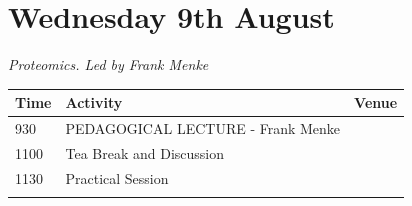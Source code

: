 \documentclass[12pt,]{book}
\theoremstyle{definition}
\theoremstyle{definition}
\theoremstyle{remark}
\begin{document}
\section*{Wednesday 9th August}\label{wednesday-9th-august}

\emph{Proteomics. Led by Frank Menke}

\begin{longtable}[]{@{}lll@{}}
\toprule
\begin{minipage}[b]{0.09\columnwidth}\raggedright\strut
Time\strut
\end{minipage} & \begin{minipage}[b]{0.38\columnwidth}\raggedright\strut
Activity\strut
\end{minipage} & \begin{minipage}[b]{0.38\columnwidth}\raggedright\strut
Venue\strut
\end{minipage}\tabularnewline
\midrule
\endhead
\begin{minipage}[t]{0.09\columnwidth}\raggedright\strut
930\strut
\end{minipage} & \begin{minipage}[t]{0.38\columnwidth}\raggedright\strut
PEDAGOGICAL LECTURE - Frank Menke\strut
\end{minipage} & \begin{minipage}[t]{0.38\columnwidth}\raggedright\strut
\strut
\end{minipage}\tabularnewline
\begin{minipage}[t]{0.09\columnwidth}\raggedright\strut
1100\strut
\end{minipage} & \begin{minipage}[t]{0.38\columnwidth}\raggedright\strut
Tea Break and Discussion\strut
\end{minipage} & \begin{minipage}[t]{0.38\columnwidth}\raggedright\strut
\strut
\end{minipage}\tabularnewline
\begin{minipage}[t]{0.09\columnwidth}\raggedright\strut
1130\strut
\end{minipage} & \begin{minipage}[t]{0.38\columnwidth}\raggedright\strut
Practical Session\strut
\end{minipage} & \begin{minipage}[t]{0.38\columnwidth}\raggedright\strut
\strut
\end{minipage}\tabularnewline
\begin{minipage}[t]{0.09\columnwidth}\raggedright\strut

\end{minipage}
\end{longtable}
\end{document}
